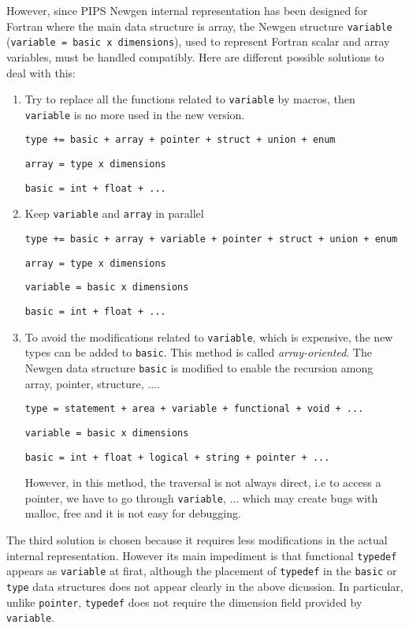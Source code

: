 \documentclass[a4paper]{report}
\begin{document}
However, since PIPS Newgen internal representation has been designed
 for Fortran where the main data structure is array, the Newgen
 structure \verb/variable/ (\verb/variable = basic x dimensions/),
 used to represent Fortran scalar and array variables, must be handled
 compatibly.  Here are different possible solutions to deal with this:
\begin{enumerate}
\item Try to replace all the functions related to \verb/variable/ by
  macros, then \verb/variable/ is no more used in the new version.

\verb/type += basic + array + pointer + struct + union + enum/

\verb/array = type x dimensions/

\verb/basic = int + float + .../

\item Keep \verb/variable/ and \verb/array/ in parallel 

\verb/type += basic + array + variable + pointer + struct + union + enum/

\verb/array = type x dimensions/

\verb/variable = basic x dimensions/

\verb/basic = int + float + .../

\item To avoid the modifications related to \verb/variable/, which is
 expensive, the new types can be added to \verb/basic/. This method is
 called {\it array-oriented}. The Newgen data structure \verb/basic/
 is modified to enable the recursion among array, pointer, structure,
 ....
  
\verb/type = statement + area + variable + functional + void + .../

\verb/variable = basic x dimensions /

\verb/basic = int + float + logical + string + pointer + .../

However, in this method, the traversal is not always direct, i.e to
 access a pointer, we have to go through \verb/variable/, ... which
 may create bugs with malloc, free and it is not easy for debugging.
\end{enumerate}

The third solution is chosen because it requires less modifications in
 the actual internal representation. However its main impediment is
 that functional \verb/typedef/ appears as \verb/variable/ at firat,
 although the placement of \verb/typedef/ in the \verb/basic/ or
 \verb/type/ data structures does not appear clearly in the above
 dicussion. In particular, unlike \verb/pointer/, \verb/typedef/ does
 not require the dimension field provided by \verb/variable/.
\end{document}
